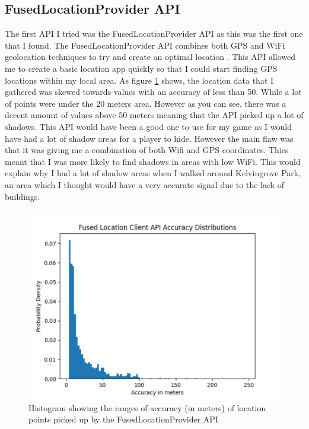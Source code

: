 \documentclass{l4proj}
\begin{document}
\subsection{FusedLocationProvider API}
The first API I tried was the FusedLocationProvider API as this was the first one that I found. The FusedLocationProvider API combines both GPS and WiFi geolocation
techniques to try and create an optimal location \citep{fused}. This API allowed me to create a basic location app quickly so that I could start finding GPS locations
within my local area. As figure \ref{fig:fusedhist} shows, the location data that I gathered was skewed towards values with an accuracy of less than 50. While a lot of
points were under the 20 meters area. However as you can see, there was a decent amount of values above 50 meters meaning that the API picked up a lot of shadows.
This API would have been a good one to use for my game as I would have had a lot of shadow areas for a player to hide. However the main flaw was that
it was giving me a combination of both Wifi and GPS coordinates. Thies meant that I was more likely to find shadows in areas with low WiFi. This would
explain why I had a lot of shadow areas when I walked around Kelvingrove Park, an area which I thought would have a very accurate signal due to the lack of buildings.

\begin{figure}
    \centering
    \includegraphics[width=0.6\linewidth]{images/fused_histogram.pdf}    

    \caption{Histogram showing the ranges of accuracy (in meters) of location points picked up by the FusedLocationProvider API}

    \label{fig:fusedhist} 
\end{figure}
\end{document}
